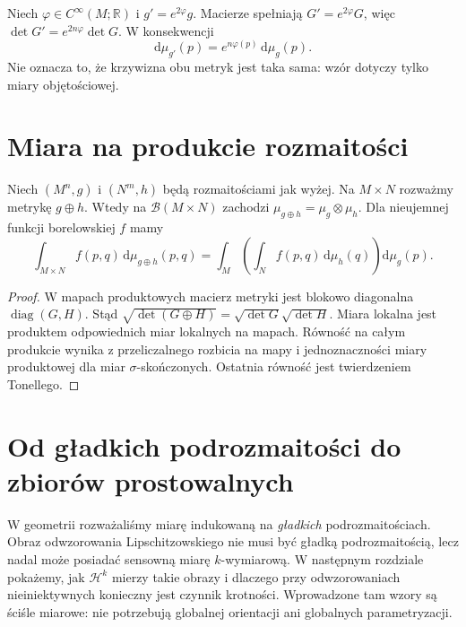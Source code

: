 \begin{przyklad}
Niech $\varphi\in C^\infty(M;\mathbb R)$ i
$g'=e^{2\varphi}g$. Macierze spełniają
$G'=e^{2\varphi}G$, więc
$\det G'=e^{2n\varphi}\det G$. W konsekwencji
\[
 \mathrm d\mu_{g'}(p)=e^{n\varphi(p)}\,\mathrm d\mu_g(p).
\]
Nie oznacza to, że krzywizna obu metryk jest
taka sama: wzór dotyczy tylko miary objętościowej.
\end{przyklad}

\section{Miara na produkcie rozmaitości}
\begin{twierdzenie}
\label{thm:product-riemann-27}
Niech $(M^n,g)$ i $(N^m,h)$ będą rozmaitościami
jak wyżej. Na $M\times N$ rozważmy metrykę
$g\oplus h$. Wtedy na $\mathcal B(M\times N)$
zachodzi $\mu_{g\oplus h}=\mu_g\otimes\mu_h$.
Dla nieujemnej funkcji borelowskiej $f$ mamy
\[
 \int_{M\times N} f(p,q)\,\mathrm d\mu_{g\oplus h}(p,q)
 =\int_M\!\left(\int_N f(p,q)\,\mathrm d\mu_h(q)\right)
   \mathrm d\mu_g(p).
\]
\end{twierdzenie}
\begin{proof}
W mapach produktowych macierz metryki jest
blokowo diagonalna $\operatorname{diag}(G,H)$.
Stąd $\sqrt{\det(G\oplus H)}=
\sqrt{\det G}\sqrt{\det H}$. Miara lokalna
jest produktem odpowiednich miar lokalnych
na mapach. Równość na całym produkcie wynika
z przeliczalnego rozbicia na mapy i jednoznaczności
miary produktowej dla miar $\sigma$-skończonych.
Ostatnia równość jest twierdzeniem Tonellego.
\end{proof}

\section{Od gładkich podrozmaitości do zbiorów prostowalnych}
W geometrii rozważaliśmy miarę indukowaną
na \emph{gładkich} podrozmaitościach. Obraz
odwzorowania Lipschitzowskiego nie musi być
gładką podrozmaitością, lecz nadal może
posiadać sensowną miarę $k$-wymiarową.
W następnym rozdziale pokażemy, jak
$\mathcal H^k$ mierzy takie obrazy i dlaczego
przy odwzorowaniach nieiniektywnych konieczny
jest czynnik krotności. Wprowadzone tam wzory
są ściśle miarowe: nie potrzebują globalnej
orientacji ani globalnych parametryzacji.